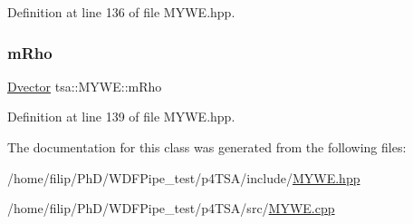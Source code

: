 Definition at line 136 of file M\+Y\+W\+E.\+hpp.

\mbox{\label{classtsa_1_1_m_y_w_e_af8263479a7212e0ee89aedd7ae098ee0}} 
\subsubsection{\texorpdfstring{m\+Rho}{mRho}}
{\footnotesize\ttfamily \hyperlink{namespacetsa_a8900fb03d849baf447a1a0efe2561fb2}{Dvector} tsa\+::\+M\+Y\+W\+E\+::m\+Rho\hspace{0.3cm}{\ttfamily [private]}}



Definition at line 139 of file M\+Y\+W\+E.\+hpp.



The documentation for this class was generated from the following files\+:\begin{DoxyCompactItemize}
\item 
/home/filip/\+Ph\+D/\+W\+D\+F\+Pipe\+\_\+test/p4\+T\+S\+A/include/\hyperlink{_m_y_w_e_8hpp}{M\+Y\+W\+E.\+hpp}\item 
/home/filip/\+Ph\+D/\+W\+D\+F\+Pipe\+\_\+test/p4\+T\+S\+A/src/\hyperlink{_m_y_w_e_8cpp}{M\+Y\+W\+E.\+cpp}\end{DoxyCompactItemize}
